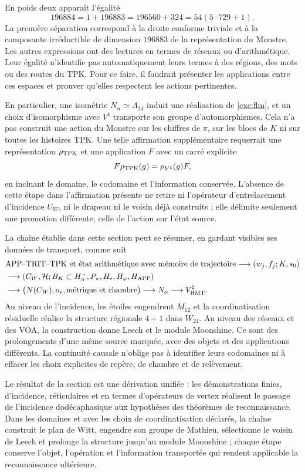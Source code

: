En poids deux apparaît l'égalité
\[
 196884=1+196883=196560+324=54(5\cdot729+1).
\]
La première séparation correspond à la droite conforme triviale et à la
composante irréductible de dimension $196883$ de la représentation
du Monstre. Les autres expressions ont des lectures en termes de réseaux ou
d'arithmétique. Leur égalité n'identifie pas automatiquement leurs termes
à des régions, des mots ou des routes du TPK. Pour ce faire, il faudrait
présenter les applications entre ces espaces et prouver qu'elles respectent les
actions pertinentes.

En particulier, une isométrie $N_\alpha\simeq\Lambda_{24}$ induit
une réalisation de \eqref{exc:flm}, et un choix d'isomorphisme
avec $V^\natural$ transporte son groupe d'automorphismes. Cela n'a pas
construit une action du Monstre sur les chiffres de
$\pi$, sur les blocs de $K$ ni sur toutes les histoires TPK.
Une telle affirmation supplémentaire requerrait une représentation
$\rho_{\rm TPK}$ et une application $F$ avec un carré explicite
\[
 F\rho_{\rm TPK}(g)=\rho_{V^\natural}(g)F,
\]
en incluant le domaine, le codomaine et l'information conservée. L'absence
de cette étape dans l'affirmation présente ne retire ni l'opérateur d'entrelacement
d'incidence $U_W$, ni le drapeau ni le voisin déjà construits ; elle
délimite seulement une promotion différente, celle de l'action sur l'état source.

La chaîne établie dans cette section peut se résumer, en gardant visibles ses données de transport, comme suit
\begin{align*}
 &\text{APP--TRIT--TPK et état arithmétique avec mémoire de trajectoire}
   \longrightarrow (w_j,f_j;K,s_0)\\
 &\longrightarrow (C_W,\mathcal H;B_K\subset H^-_\alpha,
                   P_\pi,H_e,H_\varphi,H_{\rm APP})\\
 &\longrightarrow \bigl(N(C_W),o_*,\text{métrique et chambre}\bigr)
   \longrightarrow N_\alpha
   \longrightarrow V^\natural_{\rm HMT}.
\end{align*}
Au niveau de l'incidence, les étoiles engendrent $M_{12}$ et la
coordinatisation résiduelle réalise la structure régionale $4+1$ dans $W_{24}$.
Au niveau des réseaux et des VOA, la construction donne Leech et le module
Moonshine. Ce sont des prolongements d'une même source marquée, avec
des objets et des applications différents. La continuité causale n'oblige pas à
identifier leurs codomaines ni à effacer les choix explicites
de repère, de chambre et de relèvement.

Le résultat de la section est une dérivation unifiée : les démonstrations finies, d'incidence, réticulaires et en termes d'opérateurs de vertex réalisent le passage de l'incidence dodécaphasique aux hypothèses des théorèmes de reconnaissance. Dans les domaines et avec les choix de coordinatisation déclarés, la chaîne construit le plan de Witt, engendre son groupe de Mathieu, sélectionne le voisin de Leech et prolonge la structure jusqu'au module Moonshine ; chaque étape conserve l'objet, l'opération et l'information transportée qui rendent applicable la reconnaissance ultérieure.
